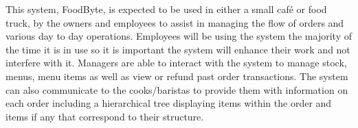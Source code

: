 This system, FoodByte, is expected to be used in either a small café or food truck, by the owners and employees to assist in managing the flow of orders and various day to day operations. Employees will be using the system the majority of the time it is in use so it is important the system will enhance their work and not interfere with it. Managers are able to interact with the system to manage stock, menus, menu items as well as view or refund past order transactions. The system can also communicate to the cooks/baristas to provide them with information on each order including a hierarchical tree displaying items within the order and items if any that correspond to their structure.